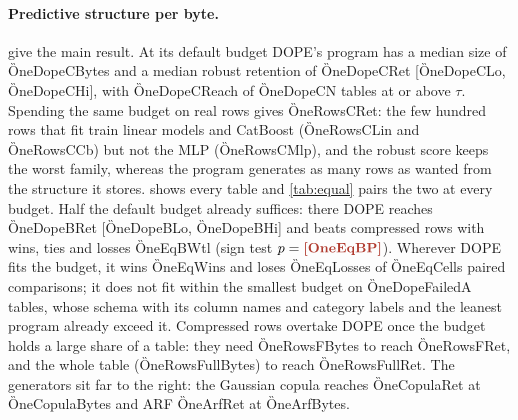 \begin{table}[t]
\centering
\caption{\textbf{Main results.} Median over tables of robust retention with its \CfgConf\% bootstrap
interval, the median retention of each auditor family, and the number of tables whose robust retention
reaches $\tau$. Bytes are medians of everything sampling reads (DOPE: the artifact file;
real rows: the xz stream; generators: xz-compressed pickles). A superscript gives the table count when a method
covers fewer tables.}
\label{tab:main}
\small
{}
\end{table}

\paragraph{Predictive structure per byte.}
 give the main result. At its default budget DOPE's program has a median
size of \G{OneDopeCBytes} and a median robust retention of \G{OneDopeCRet}
[\G{OneDopeCLo}, \G{OneDopeCHi}], with \G{OneDopeCReach} of \G{OneDopeCN} tables at or above $\tau$.
Spending the same budget on real rows gives \G{OneRowsCRet}: the few hundred rows that fit train linear
models and CatBoost (\G{OneRowsCLin} and \G{OneRowsCCb}) but not the MLP (\G{OneRowsCMlp}), and the robust
score keeps the worst family, whereas the program generates as many rows as wanted from the structure
it stores.  shows every table and \cref{tab:equal} pairs the two at every
budget. Half the default budget already suffices: there DOPE reaches \G{OneDopeBRet}
[\G{OneDopeBLo}, \G{OneDopeBHi}] and beats compressed rows with wins, ties and losses \G{OneEqBWtl}
(sign test $p=\G{OneEqBP}$). Wherever DOPE fits the budget, it wins \G{OneEqWins} and loses
\G{OneEqLosses} of \G{OneEqCells} paired comparisons; it does not fit within the smallest budget on
\G{OneDopeFailedA} tables, whose schema with its column names and category labels and the leanest
program already exceed it. Compressed rows overtake
DOPE once the budget holds a large share of a table: they need \G{OneRowsFBytes} to reach
\G{OneRowsFRet}, and the whole table (\G{OneRowsFullBytes}) to reach \G{OneRowsFullRet}.
The generators sit far to the right: the Gaussian copula reaches \G{OneCopulaRet} at
\G{OneCopulaBytes} and ARF \G{OneArfRet} at \G{OneArfBytes}.

\begin{table}[t]
\centering
\caption{\textbf{Equal bytes.} Median robust retention of DOPE and of real training rows compressed with
xz to the same budget, over the tables where both ran and DOPE fitted within the budget, with paired
wins, ties and losses, an exact sign test, and the number of tables on which DOPE did not fit.}
\label{tab:equal}
\small
{}
\end{table}

